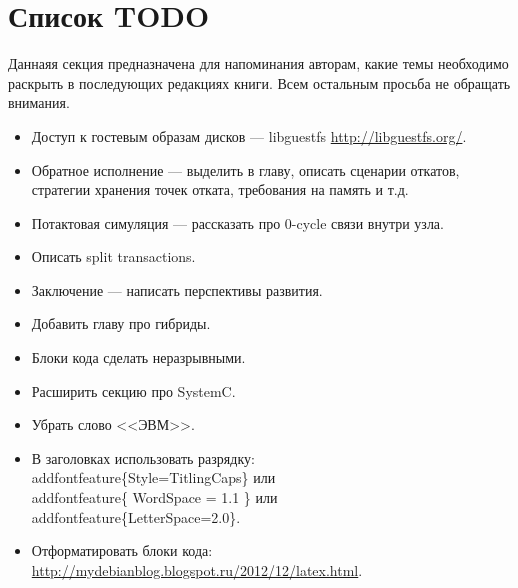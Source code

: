 \section*{Список TODO}

Даннаяя секция предназначена для напоминания авторам, какие темы необходимо раскрыть в последующих редакциях книги. Всем остальным просьба не обращать внимания.

\begin{itemize}
    \item Доступ к гостевым образам дисков --- libguestfs \url{http://libguestfs.org/}.
    \item Обратное исполнение --- выделить в главу, описать сценарии откатов, стратегии хранения точек отката, требования на память и т.д.
    \item Потактовая симуляция --- рассказать про 0-cycle связи внутри узла.
    \item Описать split transactions.
    \item Заключение --- написать перспективы развития.
	\item Добавить главу про гибриды.
	\item Блоки кода сделать неразрывными.
	\item Расширить секцию про SystemC.
    \item Убрать слово <<ЭВМ>>.
    \item В заголовках использовать разрядку: \\addfontfeature\{Style=TitlingCaps\} или \\addfontfeature\{ WordSpace = 1.1 \} или  \\addfontfeature\{LetterSpace=2.0\}.
	\item Отформатировать блоки кода: \url{http://mydebianblog.blogspot.ru/2012/12/latex.html}.
\end{itemize}
